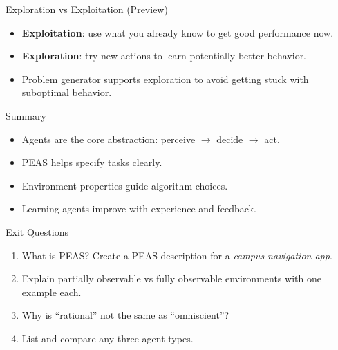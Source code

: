 \documentclass[aspectratio=169]{beamer}
\begin{document}
\begin{frame}{Exploration vs Exploitation (Preview)}
  \begin{itemize}[<+->]
    \item \textbf{Exploitation}: use what you already know to get good performance now.
    \item \textbf{Exploration}: try new actions to learn potentially better behavior.
    \item Problem generator supports exploration to avoid getting stuck with suboptimal behavior.
  \end{itemize}
\end{frame}

\begin{frame}{Summary}
  \begin{itemize}
    \item Agents are the core abstraction: perceive $\rightarrow$ decide $\rightarrow$ act.
    \item PEAS helps specify tasks clearly.
    \item Environment properties guide algorithm choices.
    \item Learning agents improve with experience and feedback.
  \end{itemize}
  \slidesources{\AIMLUnitISources}
\end{frame}

\begin{frame}{Exit Questions}
  \begin{enumerate}
    \item What is PEAS? Create a PEAS description for a \emph{campus navigation app}.
    \item Explain partially observable vs fully observable environments with one example each.
    \item Why is ``rational'' not the same as ``omniscient''?
    \item List and compare any three agent types.
  \end{enumerate}
\end{frame}
\end{document}
